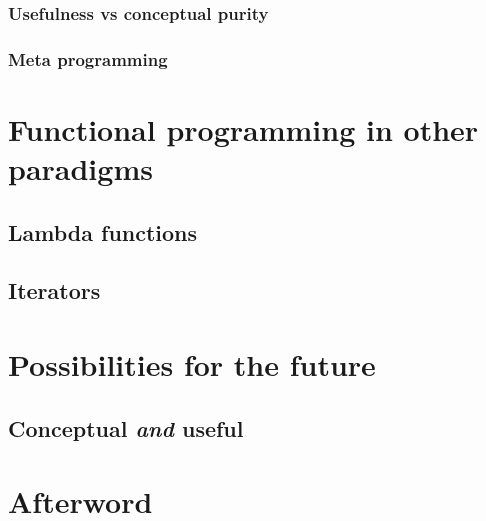 \documentclass[11pt]{article}
\begin{document}
\subsubsection{Usefulness vs conceptual purity}

\subsubsection{Meta programming}

\section{Functional programming in other paradigms}

\subsection{Lambda functions}

\subsection{Iterators}

\section{Possibilities for the future}

\subsection{Conceptual \emph{and} useful}

\section*{Afterword}

\newpage
\printbibliography[heading=bibintoc, title={References}]
\end{document}

